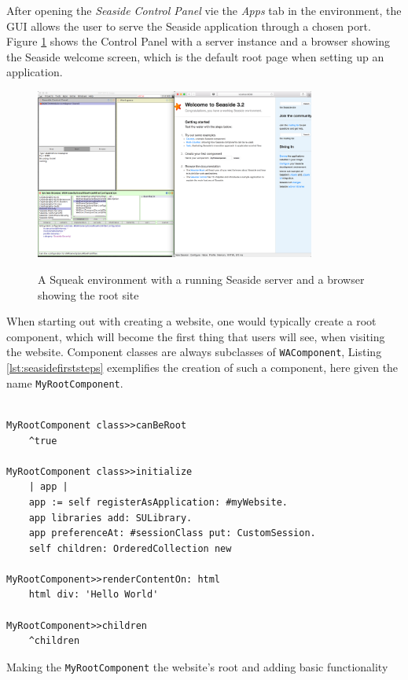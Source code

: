 \documentclass[a4paper,12pt,pagesize,headsepline,oribibl,titlepage]{scrartcl}
\begin{document}
After opening the \emph{Seaside Control Panel} vie the \emph{Apps} tab in the environment, the GUI allows the user to serve the Seaside application through a chosen port. Figure \ref{abb:start} shows the Control Panel with a server instance and a browser showing the Seaside welcome screen, which is the default root page when setting up an application.

\begin{figure}[h]
\begin{center}
\includegraphics*[width=0.82\textwidth]{images/started.png}\\
\caption{A Squeak environment with a running Seaside server and a browser showing the root site}
\label{abb:start}
\end{center}
\end{figure}

When starting out with creating a website, one would typically create a root component, which will become the first thing that users will see, when visiting the website. Component classes are always subclasses of \texttt{WAComponent}, Listing \ref{lst:seasidefirststeps} exemplifies the creation of such a component, here given the name \texttt{MyRootComponent}. 

\begin{listing}[]%
\begin{verbatim}

MyRootComponent class>>canBeRoot
    ^true
    
MyRootComponent class>>initialize
    | app |
    app := self registerAsApplication: #myWebsite.
    app libraries add: SULibrary.
    app preferenceAt: #sessionClass put: CustomSession.
    self children: OrderedCollection new
    
MyRootComponent>>renderContentOn: html
    html div: 'Hello World'
    
MyRootComponent>>children
    ^children

\end{verbatim}
\caption{Making the \texttt{MyRootComponent} the website's root and adding basic functionality}
\label{lst:seasidefirststeps}
\end{listing}
\end{document}
